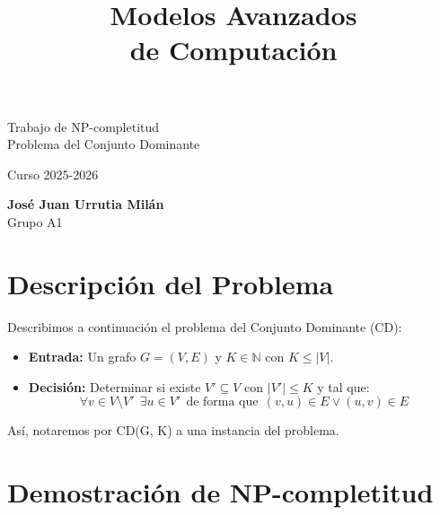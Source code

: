 \documentclass[12pt]{article}
\title{\textbf{Modelos Avanzados\\de Computación}}
\date{}  %
\newcommand{\CD}{CD(G, K) }
\begin{document}
    \maketitle

    \begin{center}
        \LARGE Trabajo de NP-completitud\\Problema del Conjunto Dominante
    \end{center}

    \vspace{1cm}

    \begin{center}
        \large Curso 2025-2026
    \end{center}
    
    \vspace{7cm}

    \begin{center}
        \textbf{José Juan Urrutia Milán} \\ 
        \vspace{1em}  %
        Grupo A1
    \end{center}

    \newpage

    \section{Descripción del Problema}
    \noindent
    Describimos a continuación el problema del Conjunto Dominante (CD):
    \begin{itemize}
        \item \textbf{Entrada:} Un grafo $G = (V,E)$ y $K\in \mathbb{N}$ con $K\leq |V|$.
        \item \textbf{Decisión:} Determinar si existe $V'\subseteq V$ con $|V'|\leq K$ y tal que:
            \begin{equation*}
                \forall v\in V\setminus V' ~~\exists u\in V' ~~\text{de forma que}~~ (v,u)\in E \lor (u,v)\in E
            \end{equation*}
    \end{itemize}
    Así, notaremos por \CD a una instancia del problema.

    \section{Demostración de NP-completitud}
\end{document}
